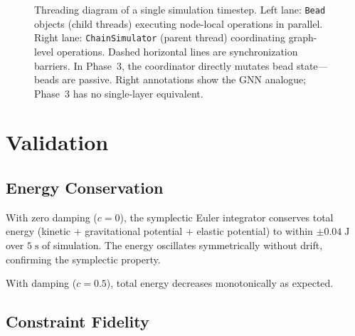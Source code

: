 \documentclass[11pt,a4paper]{article}
\begin{document}
\begin{figure}[H]
\caption{Threading diagram of a single simulation timestep. Left lane:
\texttt{Bead} objects (child threads) executing node-local operations in
parallel. Right lane: \texttt{ChainSimulator} (parent thread) coordinating
graph-level operations. Dashed horizontal lines are synchronization barriers.
In Phase~3, the coordinator directly mutates bead state---beads are passive.
Right annotations show the GNN analogue; Phase~3 has no single-layer
equivalent.}
\label{fig:flowchart}
\end{figure}

\section{Validation}

\subsection{Energy Conservation}

With zero damping ($c = 0$), the symplectic Euler integrator conserves total
energy (kinetic + gravitational potential + elastic potential) to within
$\pm 0.04\;\text{J}$ over $5\;\text{s}$ of simulation. The energy
oscillates symmetrically without drift, confirming the symplectic property.

With damping ($c = 0.5$), total energy decreases monotonically as expected.

\subsection{Constraint Fidelity}
\end{document}
